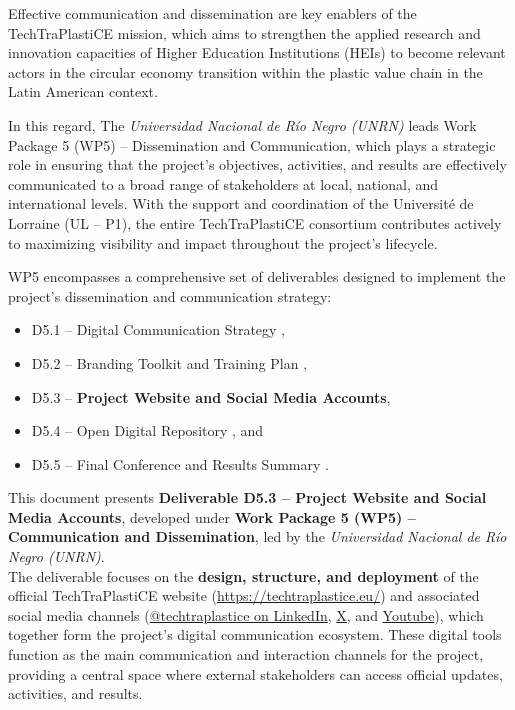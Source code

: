 \documentclass[
  12pt,
  oneside]{book}
\providecommand{\tightlist}{%
  \setlength{\itemsep}{0pt}\setlength{\parskip}{0pt}}
\begin{document}
Effective communication and dissemination are key enablers of the
TechTraPlastiCE mission, which aims to strengthen the applied research
and innovation capacities of Higher Education Institutions (HEIs) to
become relevant actors in the circular economy transition within the
plastic value chain in the Latin American context.

In this regard, The \emph{Universidad Nacional de Río Negro (UNRN)}
leads Work Package 5 (WP5) -- Dissemination and Communication, which
plays a strategic role in ensuring that the project's objectives,
activities, and results are effectively communicated to a broad range of
stakeholders at local, national, and international levels. With the
support and coordination of the Université de Lorraine (UL -- P1), the
entire TechTraPlastiCE consortium contributes actively to maximizing
visibility and impact throughout the project's lifecycle.

WP5 encompasses a comprehensive set of deliverables designed to
implement the project's dissemination and communication strategy:

\begin{itemize}
\tightlist
\item
  D5.1 -- Digital Communication Strategy ,
\item
  D5.2 -- Branding Toolkit and Training Plan ,
\item
  D5.3 -- \textbf{Project Website and Social Media Accounts},
\item
  D5.4 -- Open Digital Repository , and
\item
  D5.5 -- Final Conference and Results Summary .
\end{itemize}

This document presents \textbf{Deliverable D5.3 -- Project Website and
Social Media Accounts}, developed under \textbf{Work Package 5 (WP5) --
Communication and Dissemination}, led by the \emph{Universidad Nacional
de Río Negro (UNRN)}.\\
The deliverable focuses on the \textbf{design, structure, and
deployment} of the official TechTraPlastiCE website
(\href{techtraplastice.eu}{https://techtraplastice.eu/}) and associated
social media channels
(\href{https://www.linkedin.com/company/techtraplastice/}{@techtraplastice
on LinkedIn}, \href{https://x.com/techtraplastice}{X}, and
\href{https://www.youtube.com/@TechTraPlastiCE}{Youtube}), which
together form the project's digital communication ecosystem. These
digital tools function as the main communication and interaction
channels for the project, providing a central space where external
stakeholders can access official updates, activities, and results.
\end{document}
